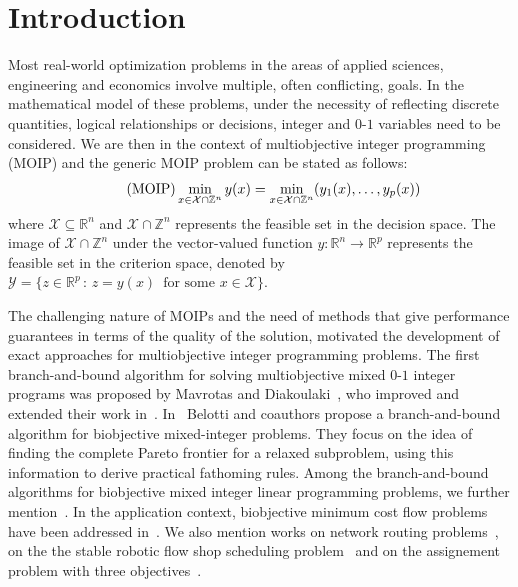 \documentclass[preprint,12pt]{elsarticle}
\def\R{\mathbb{R}}
\def\Z{\mathbb{Z}}
\begin{document}
\section{Introduction}
Most real-world optimization problems in the areas of applied sciences, engineering and economics involve multiple, often conflicting, goals.
In the mathematical model of these problems, under the necessity of reflecting discrete quantities, logical relationships or decisions,
integer and $0$-$1$ variables need to be considered. We are then in the context of multiobjective integer programming (MOIP) and the generic MOIP problem
can be stated as follows:
\begin{equation}\label{MOIP}\tag{\textnormal{MOIP}}
 \min_{x\in \mathcal{X}\cap \Z^n} y(x) = \min_{x\in \mathcal{X}\cap \Z^n} (y_1(x), \ldots, y_p(x))
\end{equation}
where $\mathcal{X}\subseteq \R^n$ and $\mathcal{X}\cap \Z^n$ represents the feasible set in the decision space. The image of $\mathcal{X}\cap \Z^n$ under
the vector-valued function $y:\R^n\rightarrow \R^p$ represents the feasible set in the criterion space, denoted by
$\mathcal{Y} = \{z\in \R^p\,:\, z = y(x) \, \mbox{ for some } x\in \mathcal{X}\}$.

The challenging nature of MOIPs and the need of methods that give performance guarantees in terms of the quality of the solution, motivated the development
of exact approaches for multiobjective integer programming problems. The first branch-and-bound algorithm for solving multiobjective mixed $0$-$1$ integer programs was proposed by Mavrotas
and Diakoulaki~\cite{mavrotas1998branch}, who improved and extended their work in~\cite{e-constraints:mavrotas2009effective, mavrotas2005multi}.
In~\cite{belotti2013branch, belotti2016fathoming} Belotti and coauthors propose a branch-and-bound algorithm for biobjective mixed-integer problems.
They focus on the idea of finding the complete Pareto frontier for a relaxed subproblem, using this information to derive practical fathoming rules.
Among the branch-and-bound algorithms for biobjective mixed integer linear programming problems, we further mention~\cite{ralphs2006improved, stidsen2014branch}.
In the application context, biobjective minimum cost flow problems have been addressed in~\cite{moradi2015bi,raith2009two,sedeno2001algorithm}.
We also mention works on network routing problems~\cite{ralphs2004improved}, on the the stable robotic flow shop scheduling problem~\cite{che2017efficient}
and on the assignement problem with three objectives~\cite{3obj:przybylski2010two}.
\end{document}
